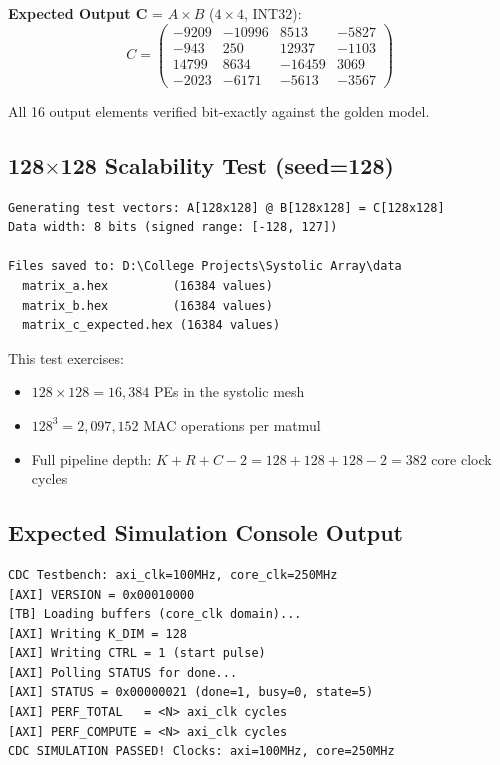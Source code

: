 \documentclass[12pt, a4paper]{article}
\begin{document}
\textbf{Expected Output C} = $A \times B$ ($4 \times 4$, INT32):
\[
C = \begin{pmatrix}
-9209 & -10996 & 8513 & -5827 \\
-943 & 250 & 12937 & -1103 \\
14799 & 8634 & -16459 & 3069 \\
-2023 & -6171 & -5613 & -3567
\end{pmatrix}
\]

All 16 output elements verified bit-exactly against the golden model.

\subsection{128$\times$128 Scalability Test (seed=128)}

\begin{lstlisting}[language={}, title={Golden Model Output (128x128)}]
Generating test vectors: A[128x128] @ B[128x128] = C[128x128]
Data width: 8 bits (signed range: [-128, 127])

Files saved to: D:\College Projects\Systolic Array\data
  matrix_a.hex         (16384 values)
  matrix_b.hex         (16384 values)
  matrix_c_expected.hex (16384 values)
\end{lstlisting}

This test exercises:
\begin{itemize}[leftmargin=1.5cm]
    \item $128 \times 128 = 16{,}384$ PEs in the systolic mesh
    \item $128^3 = 2{,}097{,}152$ MAC operations per matmul
    \item Full pipeline depth: $K + R + C - 2 = 128 + 128 + 128 - 2 = 382$ core clock cycles
\end{itemize}

\subsection{Expected Simulation Console Output}

\begin{lstlisting}[language={}, title={CDC Testbench (128x128, axi=100MHz, core=250MHz)}]
CDC Testbench: axi_clk=100MHz, core_clk=250MHz
[AXI] VERSION = 0x00010000
[TB] Loading buffers (core_clk domain)...
[AXI] Writing K_DIM = 128
[AXI] Writing CTRL = 1 (start pulse)
[AXI] Polling STATUS for done...
[AXI] STATUS = 0x00000021 (done=1, busy=0, state=5)
[AXI] PERF_TOTAL   = <N> axi_clk cycles
[AXI] PERF_COMPUTE = <N> axi_clk cycles
CDC SIMULATION PASSED! Clocks: axi=100MHz, core=250MHz
\end{lstlisting}
\end{document}
